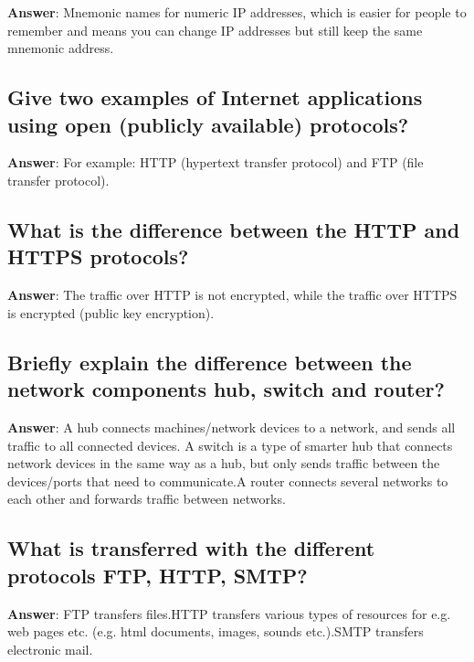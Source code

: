\documentclass[a4paper,11pt,oneside]{article}
\begin{document}
\begin{sloppypar}
\textbf{Answer}: Mnemonic names for numeric IP addresses, which is easier for people to remember and means you can change IP addresses but still keep the same mnemonic address.



\subsection{Give two examples of Internet applications using open (publicly available) protocols?}

\label{q:151:sa:en:True}

\textbf{Answer}: For example: HTTP (hypertext transfer protocol) and FTP (file transfer protocol).



\subsection{What is the difference between the HTTP and HTTPS protocols?}

\label{q:152:sa:en:True}

\textbf{Answer}: The traffic over HTTP is not encrypted, while the traffic over HTTPS is encrypted (public key encryption).



\subsection{Briefly explain the difference between the network components hub, switch and router?}

\label{q:153:sa:en:True}

\textbf{Answer}: A hub connects machines/network devices to a network, and sends all traffic to all connected devices. A switch is a type of smarter hub that connects network devices in the same way as a hub, but only sends traffic between the devices/ports that need to communicate.A router connects several networks to each other and forwards traffic between networks.



\subsection{What is transferred with the different protocols FTP, HTTP, SMTP?}

\label{q:154:sa:en:True}

\textbf{Answer}: FTP transfers files.HTTP transfers various types of resources for e.g. web pages etc. (e.g. html documents, images, sounds etc.).SMTP transfers electronic mail.




\end{sloppypar}
\end{document}
